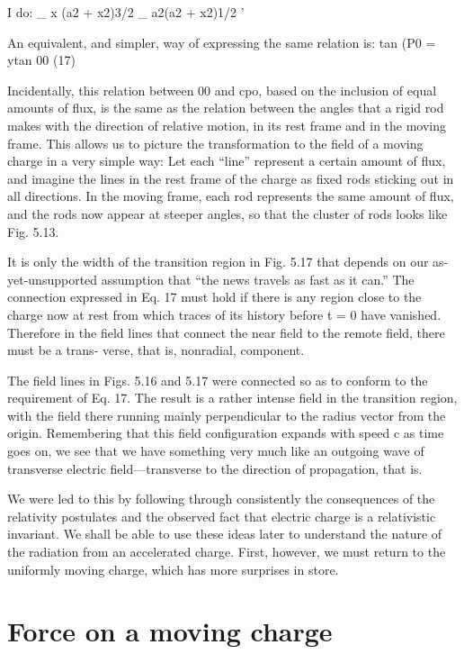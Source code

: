 I do: _ x
(a2 + x2)3/2 _ a2(a2 + x2)1/2 '

An equivalent, and simpler, way of expressing the same relation is:
tan (P0 = ytan 00 (17)
\begin{equation}
\end{equation}

Incidentally, this relation between 00 and cpo, based on the inclusion
of equal amounts of flux, is the same as the relation between the
angles that a rigid rod makes with the direction of relative motion,
in its rest frame and in the moving frame. This allows us to picture
the transformation to the field of a moving charge in a very simple
way: Let each ``line'' represent a certain amount of flux, and imagine
the lines in the rest frame of the charge as fixed rods sticking out in
all directions. In the moving frame, each rod represents the same
amount of flux, and the rods now appear at steeper angles, so that
the cluster of rods looks like Fig. 5.13.

It is only the width of the transition region in Fig. 5.17 that depends
on our as-yet-unsupported assumption that ``the news travels
as fast as it can.'' The connection expressed in Eq. 17 must hold if
there is any region close to the charge now at rest from which traces
of its history before t = 0 have vanished. Therefore in the field lines
that connect the near field to the remote field, there must be a trans-
verse, that is, nonradial, component.

The field lines in Figs. 5.16 and 5.17 were connected so as to conform
to the requirement of Eq. 17. The result is a rather intense
field in the transition region, with the field there running mainly perpendicular
to the radius vector from the origin. Remembering that
this field configuration expands with speed c as time goes on, we see
that we have something very much like an outgoing wave of transverse
electric field---transverse to the direction of propagation, that is.

We were led to this by following through consistently the consequences
of the relativity postulates and the observed fact that electric
charge is a relativistic invariant. We shall be able to use these ideas
later to understand the nature of the radiation from an accelerated
charge. First, however, we must return to the uniformly moving
charge, which has more surprises in store.

\section{Force on a moving charge}

